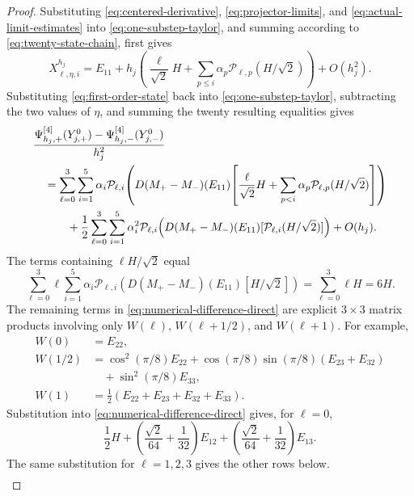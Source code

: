 \documentclass[]{article}
\numberwithin{equation}{section}
\theoremstyle{plain}
\theoremstyle{remark}
\begin{document}
\begin{proof}
Substituting \eqref{eq:centered-derivative},
\eqref{eq:projector-limits}, and \eqref{eq:actual-limit-estimates} into
\eqref{eq:one-substep-taylor}, and summing according to
\eqref{eq:twenty-state-chain}, first gives
\begin{equation}\label{eq:first-order-state}
 X^{h_j}_{\ell,\eta,i}
 =E_{11}+h_j\left(
 \frac{\ell}{\sqrt2}H
 +\sum_{p\le i}\alpha_p\mathcal P_{\ell,p}(H/\sqrt2)
 \right)+O(h_j^2).
\end{equation}
Substituting \eqref{eq:first-order-state} back into
\eqref{eq:one-substep-taylor}, subtracting the two values of $\eta$,
and summing the twenty resulting equalities gives
\begin{align}
 &\frac{\Psi^{[4]}_{h_j,+}(Y_{j,+}^0)-\Psi^{[4]}_{h_j,-}(Y_{j,-}^0)}{h_j^2}
 \notag\\
 &\quad=
 \sum_{\ell=0}^3\sum_{i=1}^5
 \alpha_i\mathcal P_{\ell,i}\!\left(
 D(M_+-M_-)(E_{11})\!\left[
 \frac{\ell}{\sqrt2}H
 +
   \sum_{p<i}\alpha_p\mathcal P_{\ell,p}(H/\sqrt2)
 \right]\right)
 \notag\\
 &\qquad\quad+\frac12
 \sum_{\ell=0}^3\sum_{i=1}^5\alpha_i^2
 \mathcal P_{\ell,i}\!\left(
 D(M_+-M_-)(E_{11})
 [\mathcal P_{\ell,i}(H/\sqrt2)]\right)+O(h_j).
 \label{eq:numerical-difference-direct}
\end{align}
The terms containing $\ell H/\sqrt2$ equal
\begin{equation}\label{eq:previous-step-sum}
 \sum_{\ell=0}^3\ell
 \sum_{i=1}^5\alpha_i\mathcal P_{\ell,i}\!\left(
 D(M_+-M_-)(E_{11})[H/\sqrt2]\right)
 =\sum_{\ell=0}^3\ell H=6H.
\end{equation}
The remaining terms in \eqref{eq:numerical-difference-direct} are
explicit $3\times3$ matrix products involving only $W(\ell)$,
$W(\ell+1/2)$, and $W(\ell+1)$.  For example,
\begin{align*}
 W(0)&=E_{22},\\
 W(1/2)&=\cos^2(\pi/8)E_{22}
 +\cos(\pi/8)\sin(\pi/8)(E_{23}+E_{32})\\
 &\quad+\sin^2(\pi/8)E_{33},\\
 W(1)&=\tfrac12(E_{22}+E_{23}+E_{32}+E_{33}).
\end{align*}
Substitution into \eqref{eq:numerical-difference-direct} gives, for
$\ell=0$,
\[
 \frac12H+\left(\frac{\sqrt2}{64}+\frac1{32}\right)E_{12}
 +\left(\frac{\sqrt2}{64}+\frac1{32}\right)E_{13}.
\]
The same substitution for $\ell=1,2,3$ gives the other rows below.
\begin{equation}\label{eq:within-step-table}
\begin{array}{c|l}

\end{array}
\end{equation}
\end{proof}
\end{document}
